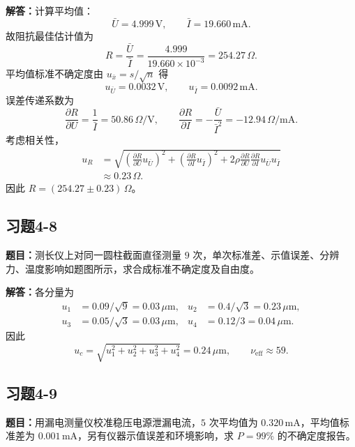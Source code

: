 \documentclass[UTF8,zihao=-4]{ctexart}
\newcommand{\problem}[1]{\subsection*{#1}}
\newcommand{\timu}{\noindent\textbf{题目：}}
\newcommand{\jieda}{\noindent\textbf{解答：}}
\begin{document}
{\jieda 计算平均值：
\begin{equation*}
    \bar{U}=4.999\,\mathrm{V},\qquad \bar{I}=19.660\,\mathrm{mA}.
\end{equation*}
故阻抗最佳估计值为
\begin{equation*}
    R=\frac{\bar{U}}{\bar{I}}=\frac{4.999}{19.660\times10^{-3}}=254.27\,\Omega.
\end{equation*}
平均值标准不确定度由 $u_{\bar{x}}=s/\sqrt n$ 得
\begin{equation*}
    u_{\bar{U}}=0.0032\,\mathrm{V},\qquad u_{\bar{I}}=0.0092\,\mathrm{mA}.
\end{equation*}
误差传递系数为
\begin{equation*}
    \frac{\partial R}{\partial U}=\frac{1}{\bar{I}}=50.86\,\Omega/\mathrm{V},
    \qquad
    \frac{\partial R}{\partial I}=-\frac{\bar{U}}{\bar{I}^2}=-12.94\,\Omega/\mathrm{mA}.
\end{equation*}
考虑相关性，
\begin{equation*}
\begin{aligned}
    u_R&=\sqrt{\left(\frac{\partial R}{\partial U}u_{\bar U}\right)^2+
    \left(\frac{\partial R}{\partial I}u_{\bar I}\right)^2+
    2\rho\frac{\partial R}{\partial U}\frac{\partial R}{\partial I}u_{\bar U}u_{\bar I}}\\
    &\approx0.23\,\Omega.
\end{aligned}
\end{equation*}
因此 $R=(254.27\pm0.23)\,\Omega$。

\problem{习题4-8}
\timu 测长仪上对同一圆柱截面直径测量 $9$ 次，单次标准差、示值误差、分辨力、温度影响如题图所示，求合成标准不确定度及自由度。

\jieda 各分量为
\begin{equation*}
\begin{aligned}
    u_1&=0.09/\sqrt9=0.03\,\mu\mathrm{m},&
    u_2&=0.4/\sqrt3=0.23\,\mu\mathrm{m},\\
    u_3&=0.05/\sqrt3=0.03\,\mu\mathrm{m},&
    u_4&=0.12/3=0.04\,\mu\mathrm{m}.
\end{aligned}
\end{equation*}
因此
\begin{equation*}
    u_c=\sqrt{u_1^2+u_2^2+u_3^2+u_4^2}=0.24\,\mu\mathrm{m},
    \qquad
    \nu_{\mathrm{eff}}\approx59.
\end{equation*}

\problem{习题4-9}
\timu 用漏电测量仪校准稳压电源泄漏电流，$5$ 次平均值为 $0.320\,\mathrm{mA}$，平均值标准差为 $0.001\,\mathrm{mA}$，另有仪器示值误差和环境影响，求 $P=99\%$ 的不确定度报告。

}
\end{document}
